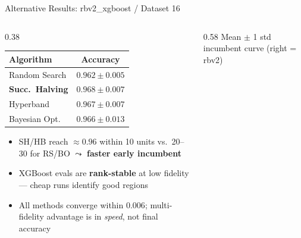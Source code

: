 \documentclass[t,english]{beamer}
\begin{document}
\begin{frame}{Alternative Results: rbv2\_xgboost / Dataset 16}
  \begin{columns}[T]
    \begin{column}{0.38\textwidth}
      \renewcommand{\tabcolsep}{3pt}
      \renewcommand{\arraystretch}{1.1}
      \begin{footnotesize}
      \begin{tabular}{lc}
        \toprule
        \textbf{Algorithm} & \textbf{Accuracy} \\
        \midrule
        Random Search            & $0.962 \pm 0.005$ \\
        \textbf{Succ.\ Halving}  & $\mathbf{0.968 \pm 0.007}$ \\
        Hyperband                & $0.967 \pm 0.007$ \\
        Bayesian Opt.            & $0.966 \pm 0.013$ \\
        \bottomrule
      \end{tabular}
      \end{footnotesize}

      \vspace{0.4em}
      \begin{itemize}\setlength\itemsep{3pt}
        \item[\small$\blacktriangleright$] {\scriptsize SH/HB reach ${\approx}0.96$ within \alert{10 units} vs.\ 20--30 for RS/BO $\leadsto$ \textbf{faster early incumbent}}
        \item[\small$\blacktriangleright$] {\scriptsize XGBoost evals are \textbf{rank-stable} at low fidelity — cheap runs identify good regions}
        \item[\small$\blacktriangleright$] {\scriptsize All methods converge within $0.006$; multi-fidelity advantage is in \emph{speed}, not final accuracy}
      \end{itemize}
    \end{column}
    \begin{column}{0.58\textwidth}
      \vskip-8pt
      {\tiny Mean $\pm$ 1 std incumbent curve (right = rbv2)}
    \end{column}
  \end{columns}
\end{frame}
\end{document}
